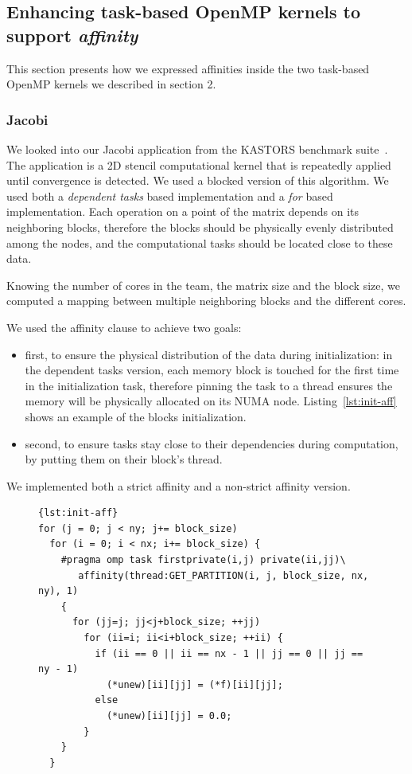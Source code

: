 \documentclass{Styles/llncs}
\begin{document}
\subsection{Enhancing task-based OpenMP kernels to support \emph{affinity}}

This section presents how we expressed affinities inside the two task-based OpenMP kernels we described in section 2.

\subsubsection{Jacobi}

We looked into our Jacobi application from the KASTORS benchmark suite~\cite{virouleau:hal-01081974}.
The application is a 2D stencil computational kernel that is repeatedly applied until
convergence is detected. We used a blocked version of this algorithm.
We used both a \emph{dependent tasks} based implementation and a \emph{for} based implementation.
Each operation on a point of the matrix depends on its neighboring blocks,
therefore the blocks should be physically evenly distributed among the nodes,
and the computational tasks should be located close to these data.

Knowing the number of cores in the team, the matrix size and the block size, we computed a mapping
between multiple neighboring blocks and the different cores.

We used the affinity clause to achieve two goals:
\begin{itemize}
    \item first, to ensure the physical distribution of the data during initialization:
      in the dependent tasks version, each memory block is touched for the first time
      in the initialization task, therefore pinning the task to a thread ensures
      the memory will be physically allocated on its NUMA node.
      Listing~\ref{lst:init-aff} shows an example of the blocks initialization.
    \item second, to ensure tasks stay close to their dependencies during computation, by putting them on their block's thread.
\end{itemize}


We implemented both a strict affinity and a non-strict affinity version.


\begin{figure}[htbp]
\begin{lstlisting}[caption=Example of use of the affinity clause for initialization,frame=tlrb,style=smaller,label=lst:init-aff]{lst:init-aff}
for (j = 0; j < ny; j+= block_size)
  for (i = 0; i < nx; i+= block_size) {
    #pragma omp task firstprivate(i,j) private(ii,jj)\
       affinity(thread:GET_PARTITION(i, j, block_size, nx, ny), 1)
    {
      for (jj=j; jj<j+block_size; ++jj)
        for (ii=i; ii<i+block_size; ++ii) {
          if (ii == 0 || ii == nx - 1 || jj == 0 || jj == ny - 1)
            (*unew)[ii][jj] = (*f)[ii][jj];
          else
            (*unew)[ii][jj] = 0.0;
        }
    }
  }
\end{lstlisting}
\end{figure}
\end{document}
